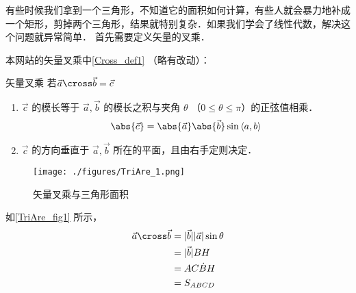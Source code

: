 

有些时候我们拿到一个三角形，不知道它的面积如何计算，有些人就会暴力地补成一个矩形，剪掉两个三角形，结果就特别复杂．如果我们学会了线性代数，解决这个问题就异常简单．
首先需要定义矢量的叉乘．

本网站的矢量叉乘中\autoref{Cross_def1} （略有改动）：
\begin{definition}{矢量叉乘} \label{TriAre_def1}
若$\vec a \cross \vec b = \vec c $
\begin{enumerate}s
\item $\vec c$ 的模长等于 $\vec a, \vec b$ 的模长之积与夹角 $\theta$ （$0 \leqslant \theta \leqslant \pi$）的正弦值相乘．
\begin{equation}\label{TriAre_eq1}
\abs{\vec c}  = \abs{\vec a} \abs{\vec b} \sin\left<a, b \right>
\end{equation}
\item $\vec c$ 的方向垂直于 $\vec a, \vec b$ 所在的平面，且由右手定则决定．
\end{enumerate}
\end{definition}
\begin{figure}[ht]
\centering
\texttt{[image: ./figures/TriAre\_1.png]}
\caption{矢量叉乘与三角形面积} \label{TriAre_fig1}
\end{figure}
如\autoref{TriAre_fig1} 所示，
\begin{equation}
\begin{aligned}
\vec a \cross \vec b &= \lvert\vec b\rvert \lvert\vec a\rvert\sin\theta \\
&= \lvert\vec b\rvert BH \\
&= AC \dot BH \\
&= S_{ABCD}
\end{aligned}
\end{equation}
